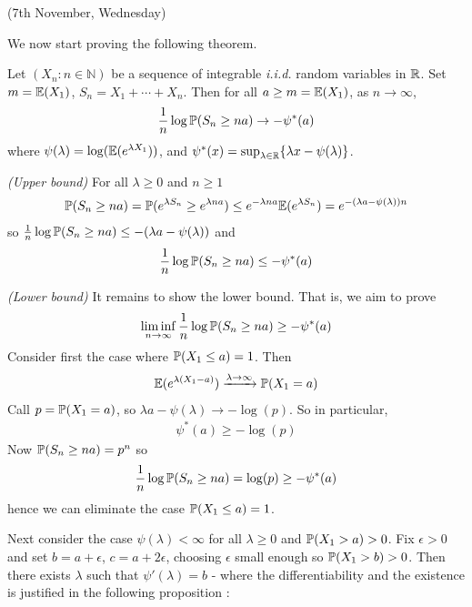 \documentclass[10pt,a4paper]{report}
\newenvironment{proof}
{\begin{changemargin}{1cm}{0.5cm} 
	}%
	{\end{changemargin}
}
\begin{document}
\s

\newday

(7th November, Wednesday)
\s

We now start proving the following theorem.
\s

 Let $(X_n : n\in \mathbb{N})$ be a sequence of integrable \emph{i.i.d.} random variables in $\mathbb{R}$. Set $m = \mathbb{E}(X_1)$, $S_n = X_1 + \cdots + X_n$. Then for all $a\geq m = \mathbb{E}(X_1)$, as $n\rightarrow \infty$,
\begin{align*}
\frac{1}{n} \log \mathbb{P} (S_n \geq na) \rightarrow -\psi^*(a)
\end{align*}
where  $\psi (\lambda) = \log (\mathbb{E}(e^{\lambda X_1}))$, and $\psi^* (x) = \sup_{\lambda \in \mathbb{R}} \{ \lambda x - \psi(\lambda) \}$.
\begin{proof}
\pf \emph{(Upper bound)} For all $\lambda \geq 0$ and $n\geq 1$
\begin{align*}
\mathbb{P}(S_n \geq na) = \mathbb{P}(e^{\lambda S_n} \geq e^{\lambda na} ) \leq e^{-\lambda na} \mathbb{E}(e^{\lambda S_n})= e^{-(\lambda a -\psi(\lambda))n}
\end{align*}
so $\frac{1}{n} \log \mathbb{P}(S_n \geq na) \leq -(\lambda a -\psi(\lambda))$ and 
\begin{align*}
\frac{1}{n} \log \mathbb{P} (S_n \geq na) \leq -\psi^* (a)
\end{align*}

\emph{(Lower bound)} It remains to show the lower bound. That is, we aim to prove
\begin{align*}
\liminf_{n\rightarrow \infty} \frac{1}{n} \log \mathbb{P} (S_n \geq na) \geq - \psi^* (a)
\end{align*}
Consider first the case where $\mathbb{P}(X_1 \leq a) = 1$. Then
\begin{align*}
\mathbb{E}(e^{\lambda(X_1-a)}) \xrightarrow{\lambda \rightarrow \infty} \mathbb{P}(X_1 =a)
\end{align*}
Call $p = \mathbb{P}(X_1 =a)$, so $\lambda a - \psi(\lambda) \rightarrow -\log (p)$. So in particular,
\begin{align*}
\psi^* (a) \geq -\log (p)
\end{align*}
Now $\mathbb{P} (S_n \geq na) = p^n$ so
\begin{align*}
\frac{1}{n} \log \mathbb{P}(S_n \geq na) = \log (p) \geq -\psi^*(a)
\end{align*}
hence we can eliminate the case $\mathbb{P}(X_1 \leq a) = 1$.
\s

\quad Next consider the case $\psi(\lambda) < \infty$ for all $\lambda \geq 0$ and $\mathbb{P}(X_1 > a) >0$. Fix $\epsilon >0$ and set $b = a+ \epsilon$, $c= a+ 2\epsilon$, choosing $\epsilon$ small enough so $\mathbb{P}(X_1 > b)>0$. Then there exists $\lambda$ such that $\psi'(\lambda) = b$ - where the differentiability and the existence is justified in the following proposition :


\end{proof}
\end{document}
